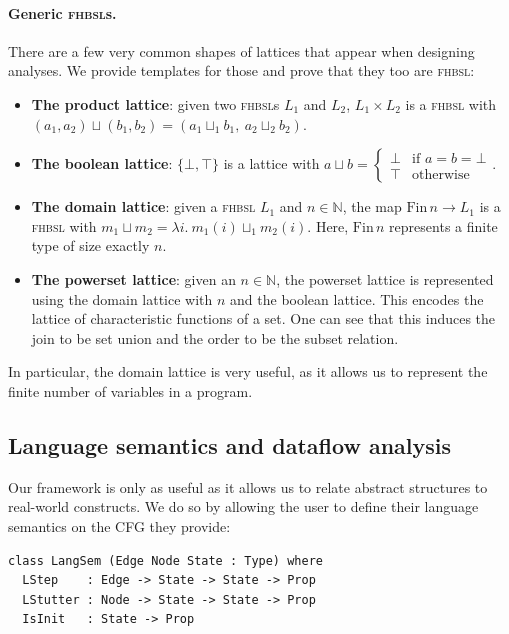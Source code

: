 \documentclass[runningheads]{llncs}
\newcommand{\lub}{\sqcup}
\newcommand{\fhbsl}{\textsc{fhbsl}}
\newcommand{\Fin}{\mathrm{Fin}}
\begin{document}
\paragraph{Generic \fhbsl{}s.}
There are a few very common shapes of lattices that appear when designing analyses. We provide templates for those and prove that they too are \fhbsl:
\begin{itemize}
  \item \textbf{The product lattice}: given two \fhbsl{}s $L_1$ and $L_2$, $L_1 \times L_2$ is a \fhbsl{} with $(a_1, a_2) \lub (b_1, b_2) = (a_1 \lub_1 b_1,\ a_2 \lub_2 b_2)$.
  \item \textbf{The boolean lattice}: $\{\bot, \top\}$ is a lattice with
    $a \lub b = \begin{cases} \bot & \text{if } a = b = \bot \\ \top & \text{otherwise} \end{cases}$.
  \item \textbf{The domain lattice}: given a \fhbsl{} $L_1$ and $n \in \mathbb{N}$, the map $\Fin\, n \to L_1$ is a \fhbsl{} with $m_1 \lub m_2 = \lambda i.\ m_1(i) \lub_1 m_2(i)$. Here, $\Fin\, n$ represents a finite type of size exactly $n$.
  \item \textbf{The powerset lattice}: given an $n \in \mathbb{N}$, the powerset lattice is represented using the domain lattice with $n$ and the boolean lattice. This encodes the lattice of characteristic functions of a set. One can see that this induces the join to be set union and the order to be the subset relation.
\end{itemize}
In particular, the domain lattice is very useful, as it allows us to represent the finite number of variables in a program.

\subsection{Language semantics and dataflow analysis}

Our framework is only as useful as it allows us to relate abstract structures to real-world constructs. We do so by allowing the user to define their language semantics on the CFG they provide:

\begin{lstlisting}[language=Lean]
class LangSem (Edge Node State : Type) where
  LStep    : Edge -> State -> State -> Prop
  LStutter : Node -> State -> State -> Prop
  IsInit   : State -> Prop
\end{lstlisting}
\end{document}
